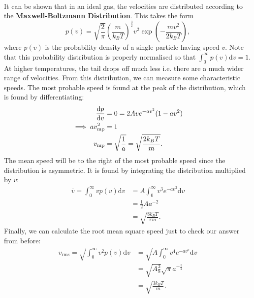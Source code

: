 \documentclass[../thermodynamics.tex]{subfiles}
\begin{document}
        \paragraph{}
        It can be shown that in an ideal gas, the velocities are distributed according to the \textbf{Maxwell-Boltzmann Distribution}.
        This takes the form
        \begin{equation}
            p(v)=\sqrt{\frac{2}{\pi}}\left(\frac{m}{k_BT}\right)^\frac{3}{2}v^2\exp\left(-\frac{mv^2}{2k_BT}\right),
        \end{equation}
        where $p(v)$ is the probability density of a single particle having speed $v$.
        Note that this probability distribution is properly normalised so that $\int_{0}^{\infty}p(v)\mathrm{d}v=1$.
        At higher temperatures, the tail drops off much less i.e. there are a much wider range of velocities.
        From this distribution, we can measure some characteristic speeds.
        The most probable speed is found at the peak of the distribution, which is found by differentiating:
        \begin{align}
            \dv{p}{v}&=0=2Ave^{-av^2}(1-av^2)\\
            \implies av_\text{mp}^2&=1\\
            v_\text{mp}&=\sqrt{\frac{1}{a}}=\sqrt{\frac{2k_BT}{m}}.
        \end{align}
        The mean speed will be to the right of the most probable speed since the distribution is asymmetric.
        It is found by integrating the distribution multiplied by $v$:
        \begin{align}
            \bar{v}=\int_{0}^{\infty}vp(v)\mathrm{d}v&=A\int_{0}^{\infty}v^3e^{-av^2}\mathrm{d}v\\
            &=\frac{1}{2}Aa^{-2}\\
            &=\sqrt{\frac{8k_BT}{\pi m}}.
        \end{align}
        Finally, we can calculate the root mean square speed just to check our answer from before:
        \begin{align}
            v_\text{rms}=\sqrt{\int_{0}^{\infty}v^2p(v)\mathrm{d}v}&=\sqrt{A\int_{0}^{\infty}v^4e^{-av^2}\mathrm{d}v}\\
            &=\sqrt{A\frac{3}{8}}\sqrt{\pi}a^{-\frac{5}{2}}\\
            &=\sqrt{\frac{3k_BT}{m}}.
        \end{align}
\end{document}
